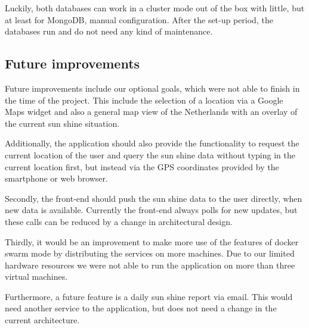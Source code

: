 \documentclass[a4paper]{article}
\begin{document}
Luckily, both databases can work in a cluster mode out of the box with little, but at least for MongoDB, manual configuration. After the set-up period, the databases run and do not need any kind of maintenance.

\subsection{Future improvements}
Future improvements include our optional goals, which were not able to finish in the time of the project. This include the selection of a location via a Google Maps widget and also a general map view of the Netherlands with an overlay of the current sun shine situation.

Additionally, the application should also provide the functionality to request the current location of the user and query the sun shine data without typing in the current location first, but instead via the GPS coordinates provided by the smartphone or web browser.

Secondly, the front-end should push the sun shine data to the user directly, when new data is available. Currently the front-end always polls for new updates, but these calls can be reduced by a change in architectural design.

Thirdly, it would be an improvement to make more use of the features of docker swarm mode by distributing the services on more machines. Due to our limited hardware resources we were not able to run the application on more than three virtual machines.

Furthermore, a future feature is a daily sun shine report via email. This would need another service to the application, but does not need a change in the current architecture.

%
%
\end{document}
